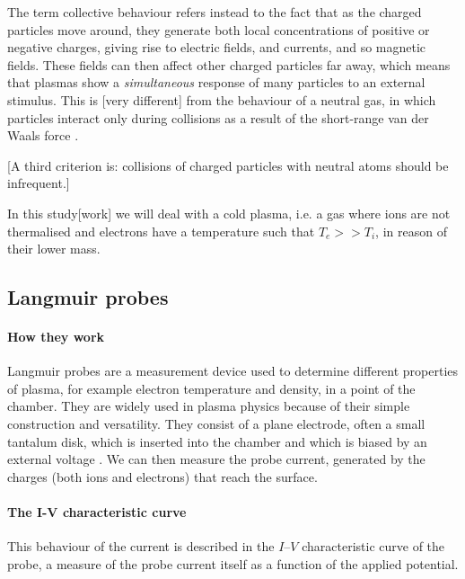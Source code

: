 The term collective behaviour refers instead to the fact that as the charged particles move around, they generate both local concentrations of positive or negative charges, giving rise to electric fields, and currents, and so magnetic fields\cite{chen_introduction_2006}.
These fields can then affect other charged particles far away\footnotemark, which means that plasmas show a \emph{simultaneous} response of many particles to an external stimulus\footnotemark.
This is [very different] from the behaviour of a neutral gas, in which particles interact only during collisions as a result of the short-range van der Waals force \cite{piel_plasma_2017}.

[A third criterion is: collisions of charged particles with neutral atoms should be infrequent.]

In this study[work] we will deal with a cold plasma, i.e. a gas where ions are not thermalised and electrons have a temperature such that $T_e >> T_i$, in reason of their lower mass\cite{bagnato_notice_2019}.

\subsection{Langmuir probes}
\paragraph{How they work}
Langmuir probes are a measurement device used to determine different properties of plasma, for example electron temperature and density, in a point of the chamber.
They are widely used in plasma physics because of their simple construction and versatility.
They consist of a plane electrode, often a small tantalum disk, which is inserted into the chamber and which is biased by an external voltage \cite{piel_plasma_2017}.
We can then measure the probe current, generated by the charges (both ions and electrons) that reach the surface.

\paragraph{The I-V characteristic curve}
This behaviour of the current is described in the $I$--$V$ characteristic curve of the probe, a measure of the probe current itself as a function of the applied potential.

